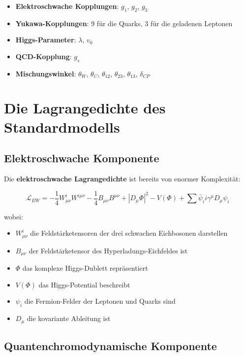 \documentclass[12pt,a4paper]{report}
\begin{document}
	\begin{itemize}
		\item \textbf{Elektroschwache Kopplungen}: $g_1$, $g_2$, $g_3$
		\item \textbf{Yukawa-Kopplungen}: 9 für die Quarks, 3 für die geladenen Leptonen
		\item \textbf{Higgs-Parameter}: $\lambda$, $v_0$
		\item \textbf{QCD-Kopplung}: $g_s$
		\item \textbf{Mischungswinkel}: $\theta_W$, $\theta_C$, $\theta_{12}$, $\theta_{23}$, $\theta_{13}$, $\delta_{CP}$
	\end{itemize}
	
	\section{Die Lagrangedichte des Standardmodells}
	
	\subsection{Elektroschwache Komponente}
	
	Die \textbf{elektroschwache Lagrangedichte} ist bereits von enormer Komplexität:
	
	\begin{equation}
		\mathcal{L}_{EW} = -\frac{1}{4} W_{\mu\nu}^i W^{i\mu\nu} - \frac{1}{4} B_{\mu\nu} B^{\mu\nu} + |D_\mu\Phi|^2 - V(\Phi) + \sum \bar{\psi}_i i\gamma^\mu D_\mu \psi_i
	\end{equation}
	
	wobei:
	\begin{itemize}
		\item $W_{\mu\nu}^i$ die Feldstärketensoren der drei schwachen Eichbosonen darstellen
		\item $B_{\mu\nu}$ der Feldstärketensor des Hyperladungs-Eichfeldes ist
		\item $\Phi$ das komplexe Higgs-Dublett repräsentiert
		\item $V(\Phi)$ das Higgs-Potential beschreibt
		\item $\psi_i$ die Fermion-Felder der Leptonen und Quarks sind
		\item $D_\mu$ die kovariante Ableitung ist
	\end{itemize}
	
	\subsection{Quantenchromodynamische Komponente}
	
\end{document}
